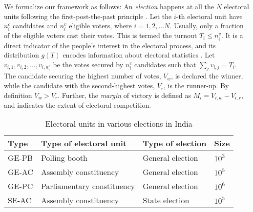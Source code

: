 We formalize our framework as follows: An {\it election} happens at all the $N$ electoral units following the first-post-the-past principle \cite{johnston2007politics}. Let the $i$-th electoral unit have $n^c_i$ candidates and $n^v_i$ eligible voters, where $i=1,2, \dots N$. Usually, only a fraction of the eligible voters cast their votes. This is termed the turnout $T_i \le n^v_i$. It is a direct indicator of the people's interest in the electoral process, and its distribution $g(T)$ encodes information about electoral statistics \cite{pal2024universal}. Let $v_{i,1}, v_{i,2}, \dots, v_{i,n^c_i}$ be the votes secured by $n^c_i$ candidates such that $\sum_j v_{i,j}=T_i$. The candidate securing the highest number of votes, $V_{w}$, is declared the winner, while the candidate with the second-highest votes, $V_{r}$, is the runner-up. By definition $V_w > V_r$. Further, the \emph{margin} of victory is defined as $M_i = V_{i, w} - V_{i, r}$, and indicates the extent of electoral competition.
\begin{table}[b]
\caption{\label{tab:example}Electoral units in various elections in India}
\begin{ruledtabular}
\begin{tabular}{llll}
Type & Type of electoral unit & Type of election & Size \\
\hline
GE-PB & Polling booth & General election  &  $10^3$ \\
GE-AC & Assembly constituency & General election  &  $10^5$ \\
GE-PC & Parliamentary constituency & General election  &  $10^6$ \\
SE-AC & Assembly constituency & State election  &  $10^5$ \\
\end{tabular}
\end{ruledtabular}
\label{table1}
\end{table}

